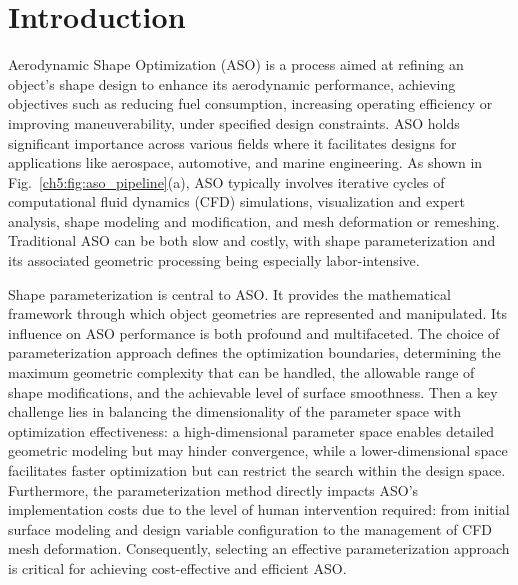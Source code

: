 \section{Introduction}

Aerodynamic Shape Optimization (ASO) is a process aimed at refining an object’s shape design to enhance its aerodynamic performance, achieving objectives such as reducing fuel consumption, increasing operating efficiency or improving maneuverability, under specified design constraints. ASO holds significant importance across various fields where it facilitates designs for applications like aerospace, automotive, and marine engineering. As shown in Fig.~\ref{ch5:fig:aso_pipeline}(a), ASO typically involves iterative cycles of computational fluid dynamics (CFD) simulations, visualization and expert analysis, shape modeling and modification, and mesh deformation or remeshing. Traditional ASO can be both slow and costly, with shape parameterization and its associated geometric processing being especially labor-intensive.

Shape parameterization is central to ASO. It provides the mathematical framework through which object geometries are represented and manipulated. Its influence on ASO performance is both profound and multifaceted. The choice of parameterization approach defines the optimization boundaries, determining the maximum geometric complexity that can be handled, the allowable range of shape modifications, and the achievable level of surface smoothness. Then a key challenge lies in balancing the dimensionality of the parameter space with optimization effectiveness: a high-dimensional parameter space enables detailed geometric modeling but may hinder convergence, while a lower-dimensional space facilitates faster optimization but can restrict the search within the design space. Furthermore, the parameterization method directly impacts ASO’s implementation costs due to the level of human intervention required: from initial surface modeling and design variable configuration to the management of CFD mesh deformation. Consequently, selecting an effective parameterization approach is critical for achieving cost-effective and efficient ASO.

